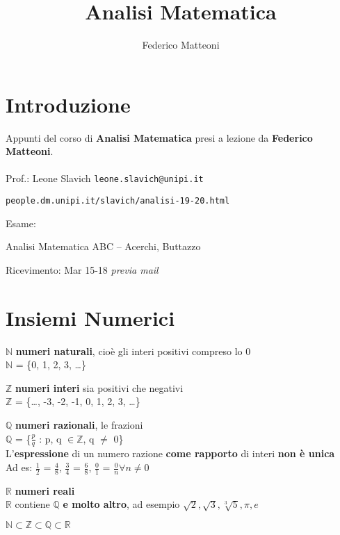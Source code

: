 \documentclass[10pt]{article}
\begin{document}
\title{Analisi Matematica}
\author{Federico Matteoni}
\date{ }
\renewcommand*\contentsname{Indice}

\maketitle
\tableofcontents
\pagebreak
\section{Introduzione}
Appunti del corso di \textbf{Analisi Matematica} presi a lezione da \textbf{Federico Matteoni}.\\\\
Prof.: Leone Slavich \texttt{leone.slavich@unipi.it}\\
\begin{list}{-}{Riferimenti web:}
\item \texttt{people.dm.unipi.it/slavich/analisi-19-20.html}
\end{list}
Esame:
\begin{list}{-}{Libri e materiale didattico:}
\item Analisi Matematica ABC -- Acerchi, Buttazzo
\end{list}
Ricevimento: Mar 15-18 \textit{previa mail}
\section{Insiemi Numerici}
\begin{list}{}{}
\item $\mathbb{N}$ \textbf{numeri naturali}, cioè gli interi positivi compreso lo 0\\
$\mathbb{N}$ = \{0, 1, 2, 3, \ldots\}
\item $\mathbb{Z}$ \textbf{numeri interi} sia positivi che negativi\\
$\mathbb{Z}$ = \{\ldots, -3, -2, -1, 0, 1, 2, 3, \ldots\}
\item $\mathbb{Q}$ \textbf{numeri razionali}, le frazioni\\
$\mathbb{Q}$ = \{$\frac{p}{q}$ : p, q $\in \mathbb{Z}$, q $\neq$ 0\}\\
L'\textbf{espressione} di un numero razione \textbf{come rapporto} di interi \textbf{non è unica}\\
Ad es: $\frac{1}{2}$ = $\frac{4}{8}$, $\frac{3}{4}$ = $\frac{6}{8}$, $\frac{0}{1}$ = $\frac{0}{n} \forall n \neq 0$
\item $\mathbb{R}$ \textbf{numeri reali}\\
$\mathbb{R}$ contiene $\mathbb{Q}$ \textbf{e molto altro}, ad esempio $\sqrt{2}, \sqrt{3}, \sqrt[3]{5}, \pi, e$
\end{list}
\begin{center}
$\mathbb{N} \subset \mathbb{Z} \subset \mathbb{Q} \subset \mathbb{R}$
\end{center}
\end{document}
